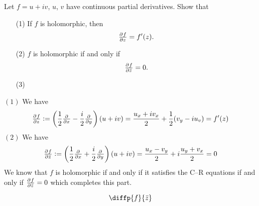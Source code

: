 \documentclass[11pt,a4paper]{article}
\begin{document}
\begin{exercise}
  Let $f = u + i v$, $u$, $v$ have continuous partial derivatives.
  Show that
  \begin{enumerate}
    \item[(1)] If $f$ is holomorphic, then
      \[
        \pd{f}{z} = f'(z).
      \]
    \item[(2)] $f$ is holomorphic if and only if
      \[
        \pd{f}{\bar z} = 0.
      \]
    \item[(3)]
  \end{enumerate}
\end{exercise}
\begin{solution}
  $(1)$ We have
  \[
    \pd{f}{z} :=
    \del{\half \pd{}{x} - \frac{i}{2} \pd{}{y}} (u + i v) =
    \frac{u_x + i v_x}{2} + \half (v_y - i u_v) = 
    f'(z)
  \]
  $(2)$ We have
  \[
    \pd{f}{\bar z} :=
    \del{\half \pd{}{x} + \frac{i}{2} \pd{}{y}} (u + i v) =
    \frac{u_x - v_y}{2} + i \frac{u_y + v_x}{2} = 0
  \]
  We know that $f$ is holomorphic if and only if it satisfies the C--R
  equations if and only if $\pd{f}{\bar z} = 0$ which completes this part.
\end{solution}

\begin{remark}
  \[
    \diffp{f}{\bar z}
  \]
\end{remark}
\end{document}
